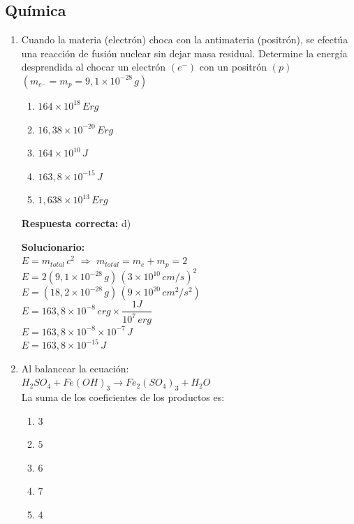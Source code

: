\subsection*{Química}

\begin{enumerate}

\item Cuando la materia (electrón) choca con la antimateria (positrón), se efectúa una reacción de fusión nuclear sin dejar masa residual. Determine la energía desprendida al chocar un electrón $(e^-)$ con un positrón $(p)$ \\
$(m_{e^-}=m_{p}=9,1\times10^{-28}\,g)$

\begin{enumerate}[label=\alph*)]
	\item $164\times10^{18}\,Erg$
	\item $16,38\times10^{-20}\,Erg$
	\item $164\times10^{10}\,J$
	\item $163,8\times10^{-15}\,J$
	\item $1,638\times10^{13}\,Erg$
\end{enumerate}

\textbf{Respuesta correcta:} d)

\vspace{2mm}
\textbf{Solucionario:}\\
$E=m_{total}\,c^{2}$ $\Longrightarrow$ $m_{total}=m_{e}+m_{p}=2$\\
$E=2(9,1\times10^{-28}\,g)\,(3\times10^{10}\,cm/s)^{2}$\\
$E=(18,2\times10^{-28}\,g)\,(9\times10^{20}\,cm^{2}/s^{2})$\\
$E=163,8\times10^{-8}\,erg \times \dfrac{1J}{10^{7}\,erg}$\\
$E=163,8\times10^{-8}\times10^{-7}\,J$\\
$E=163,8\times10^{-15}\,J$


\item Al balancear la ecuación: \\
$H_{2}SO_{4}+Fe(OH)_{3}\rightarrow Fe_{2}(SO_{4})_{3}+H_{2}O$\\
La suma de los coeficientes de los productos es:

\begin{enumerate}[label=\alph*)]
	\item $3$
	\item $5$
	\item $6$
	\item $7$
	\item $4$
\end{enumerate}


\end{enumerate}

